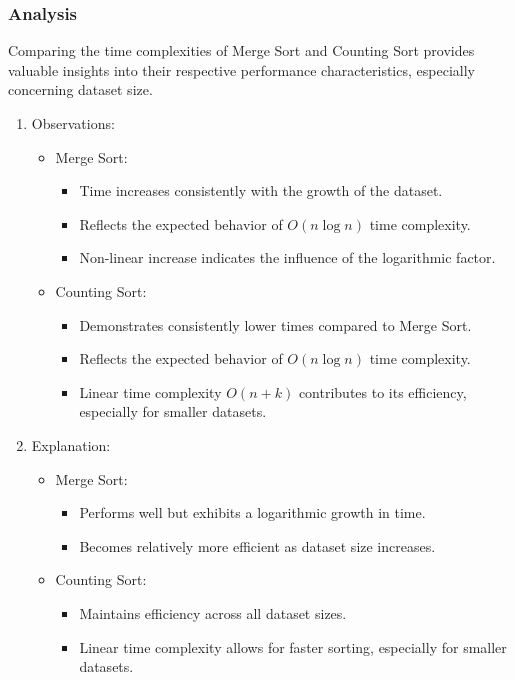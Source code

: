 \documentclass[12pt,twocolumn]{article}
\begin{document}
\subsubsection{Analysis}
Comparing the time complexities of Merge Sort and Counting Sort provides valuable insights into their respective performance characteristics, especially concerning dataset size.
\cite{researchgate}
\cite{googlescholar}
\begin{enumerate}
    \item Observations:
    \begin{itemize}
        \item Merge Sort:
        \begin{itemize}
            \item Time increases consistently with the growth of the dataset.
            \item Reflects the expected behavior of \( O(n\log n) \) time complexity.
            \item Non-linear increase indicates the influence of the logarithmic factor.
        \end{itemize}
        \item Counting Sort:
        \begin{itemize}
            \item Demonstrates consistently lower times compared to Merge Sort.
            \item Reflects the expected behavior of \( O(n\log n) \) time complexity.
            \item Linear time complexity \(O(n+k)\) contributes to its efficiency, especially for smaller datasets.
        \end{itemize}
    \end{itemize}
    \item  Explanation:
        \begin{itemize}
        \item Merge Sort:
        \begin{itemize}
            \item Performs well but exhibits a logarithmic growth in time.
            \item Becomes relatively more efficient as dataset size increases.
        \end{itemize}
        \item Counting Sort:
        \begin{itemize}
            \item Maintains efficiency across all dataset sizes.
            \item Linear time complexity allows for faster sorting, especially for smaller datasets.

\end{itemize}
\end{itemize}
\end{enumerate}
\end{document}
